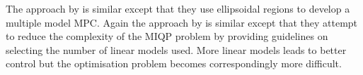 The approach by \cite{ozkan} is similar except that they use ellipsoidal regions to develop a multiple model MPC. Again the approach by \cite{kvasnica} is similar except that they attempt to reduce the complexity of the MIQP problem by providing guidelines on selecting the number of linear models used. More linear models leads to better control but the optimisation problem becomes correspondingly more difficult.

 









